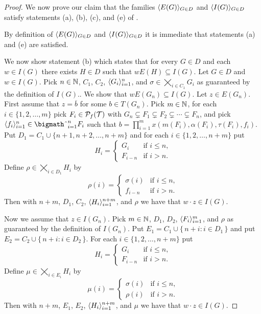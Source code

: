 \begin{proof}
  We now prove our claim that the families $\langle E(G) \rangle_{G \in D}$ and $\langle I(G) \rangle_{G \in D}$ satisfy statements (a), (b), (c), and (e) of \cite[Lemma 14.9]{Hindman:1998fk}.

  By definition of $\langle E(G) \rangle_{G \in D}$ and $\langle I(G) \rangle_{G \in D}$ it is immediate that statements (a) and (e) are satisfied. 

  We now show statement (b) which states that for every $G \in D$ and each $w \in I(G)$ there exists $H \in D$ such that $w E(H) \subseteq I(G)$.
  Let $G \in D$ and $w \in I(G)$. 
  Pick $n \in \mathbb{N}$, $C_1$, $C_2$, $\langle G_i \rangle_{i=1}^n$, and $\sigma \in \bigtimes_{i \in C_1} G_i$ as guaranteed by the definition of $I(G)$..
  We show that $w E(G_n) \subseteq I(G)$. 
  Let $z \in E(G_n)$. 
  First assume that $z = \overline{b}$ for some $b \in T(G_n)$. 
  Pick $m \in \mathbb{N}$, for each $i \in \{1, 2, \ldots, m\}$ pick $F_i \in \mathcal{P}_f(\mathcal{T})$ with $G_n \subsetneq F_1 \subsetneq F_2 \subsetneq \cdots \subsetneq F_n$, and pick $\la f_i \ra_{i=1}^n \in \bigtimes_{i=1}^n F_i$ such that $b = \prod_{i=1}^m x(m(F_i), \alpha(F_i), \tau(F_i), f_i)$. 
  Put $D_1 = C_1 \cup \{n+1, n+2, \ldots, n+m\}$ and for each $i \in \{1, 2, \ldots, n+m\}$ put 
  \[
    H_i = 
    \begin{cases}
      G_i & \mbox{if $i \le n$,} \\
      F_{i-n} & \mbox{if $i > n$.}
    \end{cases}
  \]
  Define $\rho \in \bigtimes_{i \in D_1} H_i$ by 
  \[
    \rho(i) =
    \begin{cases}
      \sigma(i) & \mbox{if $i \le n$,} \\
      f_{i-n} & \mbox{if $i > n$.}
    \end{cases}
  \]
  Then with $n+m$, $D_1$, $C_2$, $\langle H_i \rangle_{i=1}^{n+m}$, and $\rho$ we have that $w \cdot z \in I(G)$. 

  Now we assume that $z \in I(G_n)$. 
  Pick $m \in \mathbb{N}$, $D_1$, $D_2$, $\langle F_i \rangle_{i=1}^m$, and $\rho$ as guaranteed by the definition of $I(G_n)$. 
  Put $E_1 = C_1 \cup \{\,n + i : i \in D_1 \,\}$ and put $E_2 = C_2 \cup \{\, n + i : i \in D_2 \,\}$.
  For each $i \in \{1, 2, \ldots, n+m\}$ put
  \[
    H_i = 
    \begin{cases}
      G_i & \mbox{if $i \le n$,} \\
      F_{i-n} & \mbox{if $i > n$.}
    \end{cases}
  \]
  Define $\mu \in \bigtimes_{i \in E_i} H_i$ by
  \[
    \mu(i) = 
    \begin{cases}
      \sigma(i) & \mbox{if $i \le n$,} \\
      \rho(i) & \mbox{if $i > n$.}
    \end{cases}
  \]
  Then with $n+m$, $E_1$, $E_2$, $\langle H_i \rangle_{i=1}^{n+m}$, and $\mu$ we have that $w \cdot z \in I(G)$.


\end{proof}
